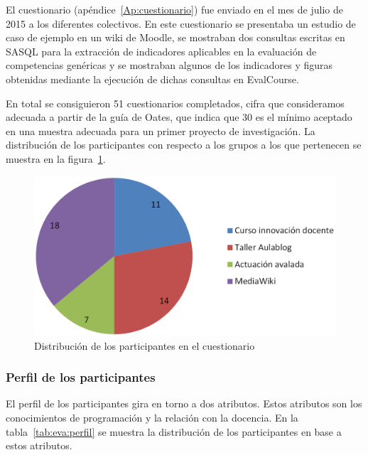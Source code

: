 El cuestionario (apéndice~\ref{Ap:cuestionario}) fue enviado en el mes de julio de 2015 a los diferentes colectivos. En este cuestionario se presentaba un estudio de caso de ejemplo en un wiki de Moodle, se mostraban dos consultas escritas en SASQL para la extracción de indicadores aplicables en la evaluación de competencias genéricas y se mostraban algunos de los indicadores y figuras obtenidas mediante la ejecución de dichas consultas en EvalCourse. 

En total se consiguieron 51 cuestionarios completados, cifra que consideramos adecuada a partir de la guía de Oates, que indica que 30 es el mínimo aceptado en una muestra adecuada para un primer proyecto de investigación. La distribución de los participantes con respecto a los grupos a los que pertenecen se muestra en la figura~\ref{fig:ResultadosParticipantes}.

\begin{figure}
  \begin{center}
    \includegraphics[scale=0.3]{ResultadosParticipantes.png}
  \end{center}
  \caption{Distribución de los participantes en el cuestionario}
  \label{fig:ResultadosParticipantes}
\end{figure}

\subsubsection{Perfil de los participantes}

El perfil de los participantes gira en torno a dos atributos. Estos atributos son los conocimientos de programación y la relación con la docencia. En la tabla~\ref{tab:eva:perfil} se muestra la distribución de los participantes en base a estos atributos.


